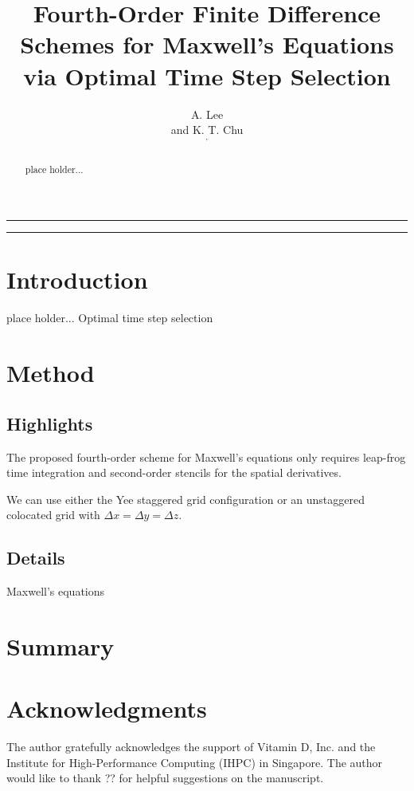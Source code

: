 \documentclass[fleqn,12pt,twoside]{article}
\def\dx{\Delta x}
\def\dy{\Delta y}
\def\dz{\Delta z}
\begin{document}


\title{Fourth-Order Finite Difference Schemes for Maxwell's Equations 
       via Optimal Time Step Selection}

\author{
A. Lee\address{YAHOO}
and
K. T. Chu\address{Vitamin D, Inc., Menlo Park, CA 94025}$^,$\address[IHPC]{Institute of High Performance Computing, A*STAR, Singapore, Singapore}
}


\maketitle

\noindent \rule{6.3in}{1pt}

\begin{abstract}
place holder...
\end{abstract}

\noindent \rule{6.3in}{1pt}


\section{Introduction}
place holder...
Optimal time step selection~\cite{chu_2009}


\section{Method}

\subsection{Highlights}
The proposed fourth-order scheme for Maxwell's equations only requires 
leap-frog time integration and second-order stencils for the spatial
derivatives.

We can use either the Yee staggered grid configuration or an unstaggered
colocated grid with $\dx = \dy = \dz $. 


\subsection{Details}
Maxwell's equations


\section{\label{sec:summary} Summary} 


\section*{Acknowledgments}
The author gratefully acknowledges the support of Vitamin D, Inc.
and the Institute for High-Performance Computing (IHPC) in Singapore. 
The author would like to thank ??  for helpful suggestions on the manuscript.  


\end{document}
